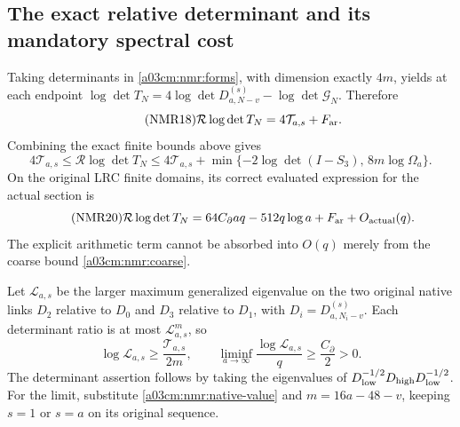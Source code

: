 \subsection{The exact relative determinant and its mandatory spectral cost}
Taking determinants in \eqref{a03cm:nmr:forms}, with dimension exactly
$4m$, yields at each endpoint
$\log\det T_N=4\log\det D_{a,N-v}^{(s)}-\log\det\mathcal G_N$.
Therefore
\begin{equation}\tag{NMR18}\label{a03cm:nmr:relative}
\mathcal R\log\det T_N=4\mathcal T_{a,s}+F_{\rm ar}.
\end{equation}
Combining the exact finite bounds above gives
\begin{equation}\tag{NMR19}\label{a03cm:nmr:relative-interval}
4\mathcal T_{a,s}\leq\mathcal R\log\det T_N
\leq4\mathcal T_{a,s}
+\min\{-2\log\det(I-S_3),\,8m\log\Omega_a\}.
\end{equation}
On the original LRC finite domains, its correct evaluated expression
for the actual section is
\begin{equation}\tag{NMR20}\label{a03cm:nmr:relative-asymptotic}
\mathcal R\log\det T_N
=64C_\partial aq-512q\log a+F_{\rm ar}+O_{\rm actual}(q).
\end{equation}
The explicit arithmetic term cannot be absorbed into $O(q)$ merely
from the coarse bound \eqref{a03cm:nmr:coarse}.

Let $\mathscr L_{a,s}$ be the larger maximum generalized eigenvalue
on the two original native links $D_2$ relative to $D_0$ and $D_3$
relative to $D_1$, with $D_i=D_{a,N_i-v}^{(s)}$.
Each determinant ratio is at most $\mathscr L_{a,s}^{m}$,
so
\begin{equation}\tag{NMR21}\label{a03cm:nmr:link-cost}
\log\mathscr L_{a,s}\geq\frac{\mathcal T_{a,s}}{2m},\qquad
\liminf_{a\to\infty}\frac{\log\mathscr L_{a,s}}q
\geq\frac{C_\partial}{2}>0 .
\end{equation}
The determinant assertion follows by taking the eigenvalues of
$D_{\rm low}^{-1/2}D_{\rm high}D_{\rm low}^{-1/2}$.
For the limit, substitute \eqref{a03cm:nmr:native-value} and
$m=16a-48-v$, keeping $s=1$ or $s=a$ on its original sequence.

